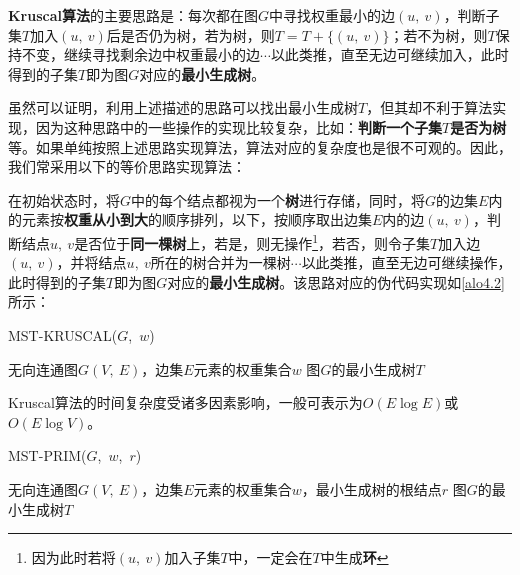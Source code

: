 \documentclass[12pt,a4paper,violet,oneside]{bbe}
\begin{document}
\textbf{Kruscal算法}的主要思路是：每次都在图$G$中寻找权重最小的边$(u,~v)$，判断子集$T$加入$(u,~v)$后是否仍为树，若为树，则$T=T+\{(u,~v)\}$；若不为树，则$T$保持不变，继续寻找剩余边中权重最小的边$\cdots$以此类推，直至无边可继续加入，此时得到的子集$T$即为图$G$对应的\textbf{最小生成树}。

虽然可以证明，利用上述描述的思路可以找出最小生成树$T$，但其却不利于算法实现，因为这种思路中的一些操作的实现比较复杂，比如：\textbf{判断一个子集$T$是否为树}等。如果单纯按照上述思路实现算法，算法对应的复杂度也是很不可观的。因此，我们常采用以下的等价思路实现算法：

在初始状态时，将$G$中的每个结点都视为一个\textbf{树}进行存储，同时，将$G$的边集$E$内的元素按\textbf{权重从小到大}的顺序排列，以下，按顺序取出边集$E$内的边$(u,~v)$，判断结点$u,~v$是否位于\textbf{同一棵树}上，若是，则无操作\footnote{因为此时若将$(u,~v)$加入子集$T$中，一定会在$T$中生成\textbf{环}}，若否，则令子集$T$加入边$(u,~v)$，并将结点$u,~v$所在的树合并为一棵树$\cdots$以此类推，直至无边可继续操作，此时得到的子集$T$即为图$G$对应的\textbf{最小生成树}。该思路对应的伪代码实现如\cref{alo4.2}所示：
\\
\begin{algorithm}[H]
	\caption{MST-KRUSCAL($G$,~$w$)}
	\label{alo4.2}
	\begin{algorithmic}[1] 
		\Require 无向连通图$G(V,~E)$，边集$E$元素的权重集合$w$
		\Ensure 图$G$的最小生成树$T$
		\textcolor{blue}{}
		\textcolor{blue}{}
		\EndFor
		\textcolor{blue}{}
		\textcolor{blue}{}
		\EndIf
		\EndFor
	\end{algorithmic} 
\end{algorithm}
\begin{remark}
	Kruscal算法的时间复杂度受诸多因素影响，一般可表示为$O(E\log E)$或$O(E\log V)$。
\end{remark}
\begin{algorithm}[H]
	\caption{MST-PRIM($G$,~$w$,~$r$)}
	\label{alo4.3}
	\begin{algorithmic}[1] 
		\Require 无向连通图$G(V,~E)$，边集$E$元素的权重集合$w$，最小生成树的根结点$r$
		\Ensure 图$G$的最小生成树$T$
		\EndFor
		\textcolor{blue}{}
		\textcolor{blue}{}
		\textcolor{blue}{}
		\EndIf
		\EndFor
		\EndWhile
	\end{algorithmic} 
\end{algorithm}
\end{document}
